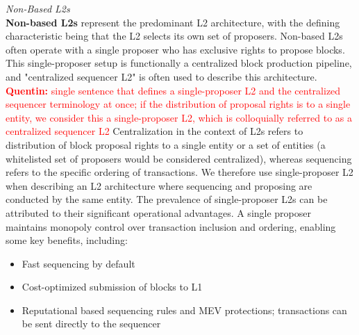\documentclass[a4paper]{article}
\theoremstyle{boldstyle}
\newcommand{\qb}[1]{\textcolor{red}{\textbf{Quentin:} #1}}
\begin{document}
    
    \textit{Non-Based L2s} \\
    \textbf{Non-based L2s} represent the predominant L2 architecture, with the defining characteristic being that the L2 selects its own set of proposers. Non-based L2s often operate with a single proposer who has exclusive rights to propose blocks. This single-proposer setup is functionally a centralized block production pipeline, and "centralized sequencer L2" is often used to describe this architecture. 
    \qb{single sentence that defines a single-proposer L2 and the centralized sequencer terminology at once; if the distribution of proposal rights is to a single entity, we consider this a single-proposer L2, which is colloquially referred to as a centralized sequencer L2}
 Centralization in the context of L2s refers to distribution of block proposal rights to a single entity or a set of entities (a whitelisted set of proposers would be considered centralized), whereas sequencing refers to the specific ordering of transactions. We therefore use single-proposer L2 when describing an L2 architecture where sequencing and proposing are conducted by the same entity. The prevalence of single-proposer L2s can be attributed to their significant operational advantages. A single proposer maintains monopoly control over transaction inclusion and ordering, enabling some key benefits, including:
        \begin{itemize}
            \item Fast sequencing by default
            \item Cost-optimized submission of blocks to L1
            \item Reputational based sequencing rules and MEV protections; transactions can be sent directly to the sequencer
        \end{itemize} 



\end{document}
